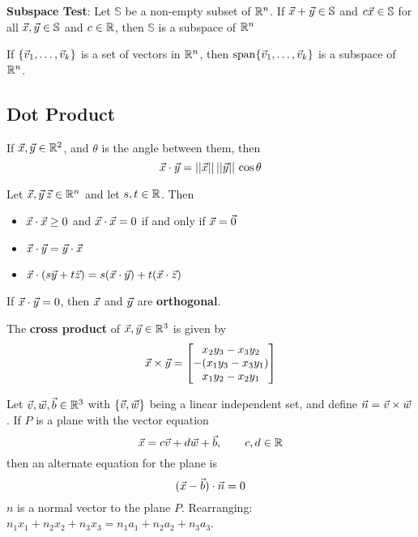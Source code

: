 \documentclass[english,12pt]{article}
\begin{document}
\begin{thrm}
\textbf{Subspace Test}: Let $\mathbb{S}$ be a non-empty subset of ${\mathbb{R}}^n$. If $\vec{x} + \vec{y} \in \mathbb{S}$ and $c \vec{x} \in \mathbb{S}$ for all $\vec{x},\vec{y} \in \mathbb{S}$ and $c \in {\mathbb{R}}$, then $\mathbb{S}$ is a subspace of ${\mathbb{R}}^n$
\end{thrm}

\begin{thrm}
If $\{\vec{v}_{1},\dots,\vec{v}_{k}\}$ is a set of vectors in ${\mathbb{R}}^n$, then $\operatorname{span} \{\vec{v}_{1},\dots,\vec{v}_{k}\}$ is a subspace of ${\mathbb{R}}^n$.
\end{thrm}

\subsection{Dot Product}

\begin{thrm}
If $\vec{x},\vec{y} \in {\mathbb{R}}^2$, and $\theta$ is the angle between them, then
\[\vec{x} \cdot \vec{y} = ||\vec{x}||\,||\vec{y}||\, \cos \theta\]
\end{thrm}

\begin{thrm}
Let $\vec{x},\vec{y}\,\vec{z} \in {\mathbb{R}}^n$ and let $s,t \in {\mathbb{R}}$. Then
\begin{itemize}
\item $\vec{x} \cdot \vec{x} \geq 0$ and $\vec{x} \cdot \vec{x} = 0$ if and only if $\vec{x} = \vec{0}$
\item $\vec{x} \cdot \vec{y} = \vec{y} \cdot \vec{x}$
\item $\vec{x} \cdot (s\vec{y} + t \vec{z}) = s (\vec{x} \cdot \vec{y}) + t (\vec{x} \cdot \vec{z})$
\end{itemize}
\end{thrm}

\begin{thrm}
If $\vec{x} \cdot \vec{y} = 0$, then $\vec{x}$ and $\vec{y}$ are \textbf{orthogonal}.
\end{thrm}

\begin{thrm}
The \textbf{cross product} of $\vec{x},\vec{y} \in {\mathbb{R}}^3$ is given by
\[\vec{x} \times \vec{y} =
\begin{bmatrix}
x_{2}y_{3} - x_{3} y_{2} \\
- (x_{1} y_{3} - x_{3} y_{1}) \\
x_{1} y_{2} - x_{2} y_{1}
\end{bmatrix}\]
\end{thrm}

\begin{thrm}
Let $\vec{v},\vec{w}, \vec{b} \in {\mathbb{R}}^3$ with $\{\vec{v},\vec{w}\}$ being a linear independent set, and define $\vec{n} = \vec{v} \times \vec{w}$. If $P$ is a plane with the vector equation
\[ \vec{x} = c \vec{v} + d \vec{w} + \vec{b}, \qquad c,d \in {\mathbb{R}}\]
then an alternate equation for the plane is
\[(\vec{x} - \vec{b}) \cdot \vec{n} = 0\]
$n$ is a normal vector to the plane $P$.
Rearranging: $n_{1} x_{1} + n_{2} x_{2} + n_{3} x_{3} = n_{1} a_{1} + n_{2} a_{2} + n_{3} a_{3}$.
\end{thrm}
\end{document}

